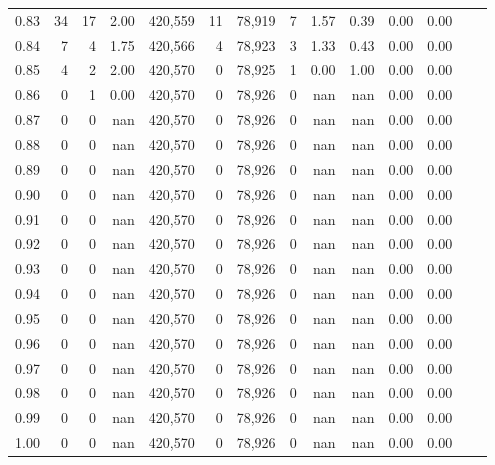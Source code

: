 \begin{tabular}{rrrrrrrrrrrrrr}
0.83 &      34 &     17 &    2.00 &  420,559 &       11 &  78,919 &       7 &  1.57 &  0.39 &  0.00 &      0.00 \\
0.84 &       7 &      4 &    1.75 &  420,566 &        4 &  78,923 &       3 &  1.33 &  0.43 &  0.00 &      0.00 \\
0.85 &       4 &      2 &    2.00 &  420,570 &        0 &  78,925 &       1 &  0.00 &  1.00 &  0.00 &      0.00 \\
0.86 &       0 &      1 &    0.00 &  420,570 &        0 &  78,926 &       0 &   nan &   nan &  0.00 &      0.00 \\
0.87 &       0 &      0 &     nan &  420,570 &        0 &  78,926 &       0 &   nan &   nan &  0.00 &      0.00 \\
0.88 &       0 &      0 &     nan &  420,570 &        0 &  78,926 &       0 &   nan &   nan &  0.00 &      0.00 \\
0.89 &       0 &      0 &     nan &  420,570 &        0 &  78,926 &       0 &   nan &   nan &  0.00 &      0.00 \\
0.90 &       0 &      0 &     nan &  420,570 &        0 &  78,926 &       0 &   nan &   nan &  0.00 &      0.00 \\
0.91 &       0 &      0 &     nan &  420,570 &        0 &  78,926 &       0 &   nan &   nan &  0.00 &      0.00 \\
0.92 &       0 &      0 &     nan &  420,570 &        0 &  78,926 &       0 &   nan &   nan &  0.00 &      0.00 \\
0.93 &       0 &      0 &     nan &  420,570 &        0 &  78,926 &       0 &   nan &   nan &  0.00 &      0.00 \\
0.94 &       0 &      0 &     nan &  420,570 &        0 &  78,926 &       0 &   nan &   nan &  0.00 &      0.00 \\
0.95 &       0 &      0 &     nan &  420,570 &        0 &  78,926 &       0 &   nan &   nan &  0.00 &      0.00 \\
0.96 &       0 &      0 &     nan &  420,570 &        0 &  78,926 &       0 &   nan &   nan &  0.00 &      0.00 \\
0.97 &       0 &      0 &     nan &  420,570 &        0 &  78,926 &       0 &   nan &   nan &  0.00 &      0.00 \\
0.98 &       0 &      0 &     nan &  420,570 &        0 &  78,926 &       0 &   nan &   nan &  0.00 &      0.00 \\
0.99 &       0 &      0 &     nan &  420,570 &        0 &  78,926 &       0 &   nan &   nan &  0.00 &      0.00 \\
1.00 &       0 &      0 &     nan &  420,570 &        0 &  78,926 &       0 &   nan &   nan &  0.00 &      0.00 \\
\bottomrule
\end{tabular}
